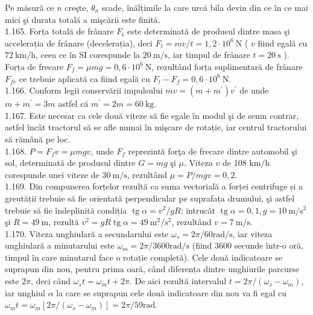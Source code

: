 Pe măsură ce $n$ creşte, $\theta_{n}$ scade, înălțimile la care urcă bila devin din ce în ce mai mici şi durata totală a mişcării este finită.\\
1.165. Forța totală de frânare $F_{t}$ este determinată de produsul dintre masa şi accelerația de frânare (decelerația), deci $F_{t}=m v / t=1,2 \cdot 10^{6} \mathrm{~N}$ ( $v$ fiind egală cu $72 \mathrm{~km} / \mathrm{h}$, ceea ce în SI corespunde la $20 \mathrm{~m} / \mathrm{s}$, iar timpul de frânare $t=20 \mathrm{~s}$ ). Forța de frecare $F_{f}=\mu m g=0,6 \cdot 10^{6} \mathrm{~N}$, rezultând forța suplimentară de frânare $F_{f r}$ ce trebuie aplicată ca fiind egală cu $F_{t}-F_{f}=0,6 \cdot 10^{6} \mathrm{~N}$.\\
1.166. Conform legii conservării impulsului $m v=\left(m+m^{\prime}\right) v^{\prime}$ de unde $m+m^{\prime}=3 m$ astfel că $m^{\prime}=2 m=60 \mathrm{~kg}$.\\
1.167. Este necesar ca cele două viteze să fie egale în modul şi de semn contrar, astfel încât tractorul să se afle numai în mişcare de rotație, iar centrul tractorului să rămână pe loc.\\
1.168. $P=F_{f} v=\mu m g v$, unde $F_{f}$ reprezintă forţa de frecare dintre automobil şi sol, determinată de produsul dintre $G=m g$ şi $\mu$. Viteza $v$ de 108 $\mathrm{km} / \mathrm{h}$ corespunde unei viteze de $30 \mathrm{~m} / \mathrm{s}$, rezultând $\mu=P / m g v=0,2$.\\
1.169. Din compunerea forțelor rezultă ca suma vectorială a forței centrifuge și a greutății trebuie să fie orientată perpendicular pe suprafața drumului, şi astfel trebuie să fie îndeplinită condiția $\operatorname{tg} \alpha=v^{2} / g R$; intrucât $\operatorname{tg} \alpha=0,1, g=10 \mathrm{~m} / \mathrm{s}^{2}$ şi $R=49 \mathrm{~m}$, rezultă $v^{2}=g R \operatorname{tg} \alpha=49 \mathrm{~m}^{2} / \mathrm{s}^{2}$, rezultând $v=7 \mathrm{~m} / \mathrm{s}$.\\
1.170. Viteza unghiulară a secundarului este $\omega_{s}=2 \pi / 60 \mathrm{rad} / \mathrm{s}$, iar viteza unghiulară a minutarului este $\omega_{m}=2 \pi / 3600 \mathrm{rad} / \mathrm{s}$ (fiind 3600 secunde într-o oră, timpul în care minutarul face o rotație completă). Cele două indicatoare se suprapun din nou, pentru prima oară, când diferența dintre unghiurile parcurse este $2 \pi$, deci când $\omega_{s} t=\omega_{m} t+2 \pi$. De aici rezultă intervalul $t=2 \pi /\left(\omega_{s}-\omega_{m}\right)$, iar unghiul $\alpha$ la care se suprapun cele două indicatoare din nou va fi egal cu $\omega_{m} t=\omega_{m}\left[2 \pi /\left(\omega_{s}-\omega_{m}\right)\right]=2 \pi / 59 \mathrm{rad}$.\\

